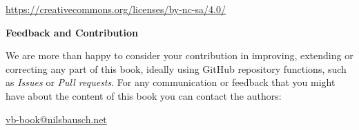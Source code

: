 {\noindent
\url{https://creativecommons.org/licenses/by-nc-sa/4.0/}

\vspace{25pt}

\noindent
{\sffamily\bfseries Feedback and Contribution}

\noindent
We are more than happy to consider your contribution in improving, extending or correcting any part of this book, ideally using GitHub repository functions, such as \emph{Issues} or \emph{Pull requests}.
For any communication or feedback that you might have about the content of this book you can contact the authors:

\noindent
\href{mailto:vb-book@nilsbausch.net}{vb-book@nilsbausch.net}

\vfill
\noindent

} %
